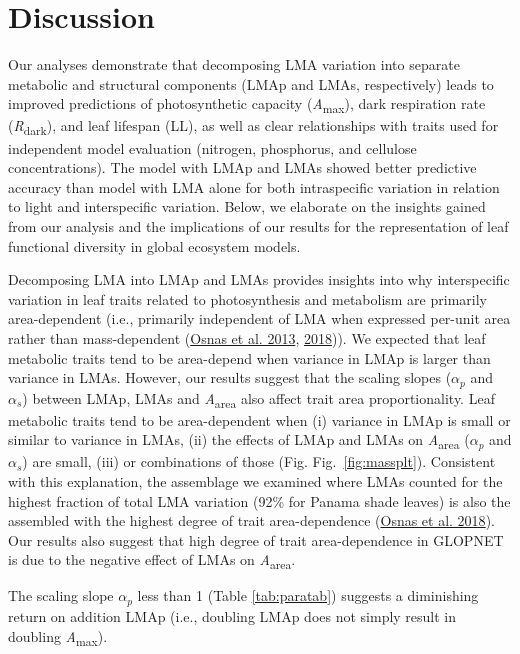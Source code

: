 \documentclass[
  12pt,
]{article}
\begin{document}
\hypertarget{discussion}{%
\section{Discussion}\label{discussion}}

Our analyses demonstrate that decomposing LMA variation into separate metabolic and structural components (LMAp and LMAs, respectively) leads to improved predictions of photosynthetic capacity (\emph{A}\textsubscript{max}), dark respiration rate (\emph{R}\textsubscript{dark}), and leaf lifespan (LL), as well as clear relationships with traits used for independent model evaluation (nitrogen, phosphorus, and cellulose concentrations).
The model with LMAp and LMAs showed better predictive accuracy than model with LMA alone for both intraspecific variation in relation to light and interspecific variation.
Below, we elaborate on the insights gained from our analysis and the implications of our results for the representation of leaf functional diversity in global ecosystem models.

Decomposing LMA into LMAp and LMAs provides insights into why interspecific variation in leaf traits related to photosynthesis and metabolism are primarily area-dependent (i.e., primarily independent of LMA when expressed per-unit area rather than mass-dependent (\protect\hyperlink{ref-Osnas2013}{Osnas et al. 2013}, \protect\hyperlink{ref-Osnas2018}{2018})).
We expected that leaf metabolic traits tend to be area-depend when variance in LMAp is larger than variance in LMAs.
However, our results suggest that the scaling slopes (\(\alpha_p\) and \(\alpha_s\)) between LMAp, LMAs and \emph{A}\textsubscript{area} also affect trait area proportionality.
Leaf metabolic traits tend to be area-dependent when (i) variance in LMAp is small or similar to variance in LMAs, (ii) the effects of LMAp and LMAs on \emph{A}\textsubscript{area} (\(\alpha_p\) and \(\alpha_s\)) are small, (iii) or combinations of those (Fig. Fig.~\ref{fig:massplt}).
Consistent with this explanation, the assemblage we examined where LMAs counted for the highest fraction of total LMA variation (92\% for Panama shade leaves) is also the assembled with the highest degree of trait area-dependence (\protect\hyperlink{ref-Osnas2018}{Osnas et al. 2018}).
Our results also suggest that high degree of trait area-dependence in GLOPNET is due to the negative effect of LMAs on \emph{A}\textsubscript{area}.

The scaling slope \(\alpha_p\) less than 1 (Table \ref{tab:paratab}) suggests a diminishing return on addition LMAp (i.e., doubling LMAp does not simply result in doubling \emph{A}\textsubscript{max}).
\end{document}
